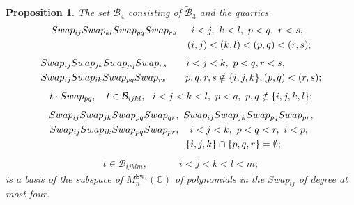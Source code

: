 \documentclass[10pt,a4paper]{amsart}
\newtheorem{proposition}{Proposition}
\begin{document}
\begin{proposition}
	The set $\mathcal{B}_4$ consisting of $\tilde{\mathcal{B}}_3$ and the quartics
	\begin{equation}\label{eq: type 8}
		\begin{split}
			\textnormal{Swap}_{ij} \textnormal{Swap}_{kl} \textnormal{Swap}_{pq} \textnormal{Swap}_{rs} \quad \ \,
			&i < j, \ k < l,\  p < q,\ r < s,  \\ (&i,j) < (k,l) < (p,q)<(r,s);\\
		\end{split}
	\end{equation}
\vspace{0.1mm}
	\begin{equation}\label{eq: type 7}
		\begin{split}
			&\textnormal{Swap}_{ij} \textnormal{Swap}_{jk} \textnormal{Swap}_{pq} \textnormal{Swap}_{rs}\quad \quad  i < j < k,\  p<q, r<s, \\
			 &\textnormal{Swap}_{ij} \textnormal{Swap}_{ik} \textnormal{Swap}_{pq} \textnormal{Swap}_{rs}  \quad\quad p,q,r,s \notin \{i,j,k\}, (p,q)<(r,s);\\
		\end{split}
	\end{equation}
\vspace{0.1mm}
	\begin{equation}\label{eq: type 6-a}
		\begin{split}
			t\cdot\textnormal{Swap}_{pq}, \quad t \in \mathcal{B}_{ijkl},\ \ i < j < k < l,\ p<q,\ p,q \notin \{i,j,k,l\};\\		
		\end{split}
	\end{equation}
\vspace{0.1mm}
	\begin{equation}\label{eq: type 6-b}
		\begin{split}
			\textnormal{Swap}_{ij} \textnormal{Swap}_{jk} \textnormal{Swap}_{pq} \textnormal{Swap}_{qr}&, \ 
			\textnormal{Swap}_{ij} \textnormal{Swap}_{jk} \textnormal{Swap}_{pq} \textnormal{Swap}_{pr},\\
			\textnormal{Swap}_{ij} \textnormal{Swap}_{ik} \textnormal{Swap}_{pq} \textnormal{Swap}_{pr}&,
			\quad i < j < k, \ p<q<r, \ i<p,\\	
			 &\quad\{i,j,k\} \cap \{p,q,r\} = \emptyset;	
		\end{split}
	\end{equation}
\vspace{2mm}
	\begin{equation}\label{eq: type 55}
		\begin{split}
			t \in \mathcal{B}_{ijklm},\ \quad \quad \quad i < j < k < l < m;
		\end{split}
	\end{equation}
	is a basis of the subspace of $M^{\text{Sw}_4}_n(\mathbb{C})$ of polynomials in the Swap$_{ij}$ of degree at most four. 
\end{proposition}
\end{document}
